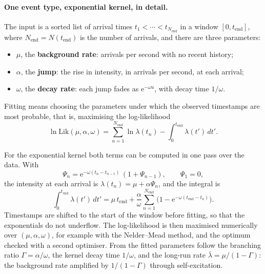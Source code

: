 \paragraph{One event type, exponential kernel, in detail.}
\label{sec:pp-mle}
The input is a sorted list of arrival times $t_1 < \cdots < t_{N_{\text{end}}}$ in a window
$[0, t_{\text{end}}]$, where $N_{\text{end}} = N(t_{\text{end}})$ is the number of arrivals, and
there are three parameters:
\begin{itemize}[leftmargin=1.5em,itemsep=1pt]
\item $\mu$, the \textbf{background rate}: arrivals per second with no recent history;
\item $\alpha$, the \textbf{jump}: the rise in intensity, in arrivals per second, at each arrival;
\item $\omega$, the \textbf{decay rate}: each jump fades as $\mathrm{e}^{-\omega u}$, with decay time
  $1/\omega$.
\end{itemize}
Fitting means choosing the parameters under which the observed timestamps are most probable, that
is, maximising the log-likelihood~\citep{ozaki1979}
\begin{equation}
  \ln \mathrm{Lik}(\mu, \alpha, \omega) = \sum_{n=1}^{N_{\text{end}}} \ln \lambda(t_n)
  - \int_0^{t_{\text{end}}} \lambda(t')\, dt'.
  \label{eq:hawkes-loglik}
\end{equation}

For the exponential kernel both terms can be computed in one pass over the data. With
\[
  \Psi_n = \mathrm{e}^{-\omega (t_n - t_{n-1})}\,(1 + \Psi_{n-1}), \qquad \Psi_1 = 0,
\]
the intensity at each arrival is $\lambda(t_n) = \mu + \alpha \Psi_n$, and the integral is
\[
  \int_0^{t_{\text{end}}} \lambda(t')\, dt' = \mu\, t_{\text{end}}
  + \frac{\alpha}{\omega} \sum_{n=1}^{N_{\text{end}}} \Big(1 - \mathrm{e}^{-\omega (t_{\text{end}} - t_n)}\Big).
\]
Timestamps are shifted to the start of the window before fitting, so that the exponentials do not
underflow. The log-likelihood is then maximised numerically over $(\mu, \alpha, \omega)$, for example
with the Nelder--Mead method, and the optimum checked with a second optimiser. From the fitted
parameters follow the branching ratio $\Gamma = \alpha/\omega$, the kernel decay time $1/\omega$, and
the long-run rate $\bar\lambda = \mu/(1 - \Gamma)$: the background rate amplified by $1/(1-\Gamma)$
through self-excitation.



